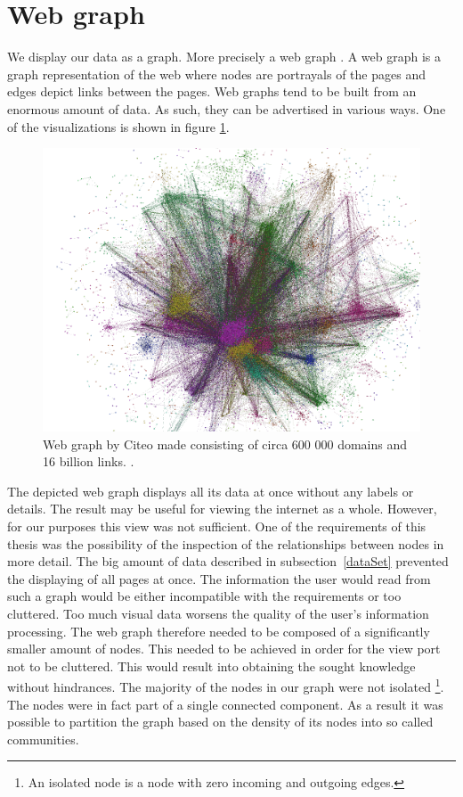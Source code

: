 \section{Web graph} \label{webGraph}
We display our data as a graph. More precisely a web graph \cite{the_web_graph_overview}. A web graph is a graph representation of the web where nodes are portrayals of the pages and edges depict links between the pages. Web graphs tend to be built from an enormous amount of data. As such, they can be advertised in various ways. One of the visualizations is shown in figure  \ref{hugeWebGraphFireworks}. 
\begin{figure}[ht!]
  \centering
  \includegraphics[width=\textwidth]{Images/hugeWebGraphFireworks.png}
  \caption{Web graph by Citeo made consisting of circa 600 000 domains and 16 billion links. \cite{hugeWebGraphFireworks}.}
  \label{hugeWebGraphFireworks}
\end{figure} 
The depicted web graph displays all its data at once without any labels or details. The result may be useful for viewing the internet as a whole. However, for our purposes this view was not sufficient. One of the requirements of this thesis was the possibility of the inspection of the relationships between nodes in more detail. The big amount of data described in subsection~\ref{dataSet} prevented the displaying of all pages at once. The information the user would read from such a graph would be either incompatible with the requirements or too cluttered. Too much visual data worsens the quality of the user's information processing. The web graph therefore needed to be composed of a significantly smaller amount of nodes. This needed to be achieved in order for the view port not to be cluttered. This would result into obtaining the sought knowledge without hindrances. The majority of the nodes in our graph were not isolated \footnote{An isolated node is a node with zero incoming and outgoing edges.}. The nodes were in fact part of a single connected component. As a result it was possible to partition the graph based on the density of its nodes into so called communities.

